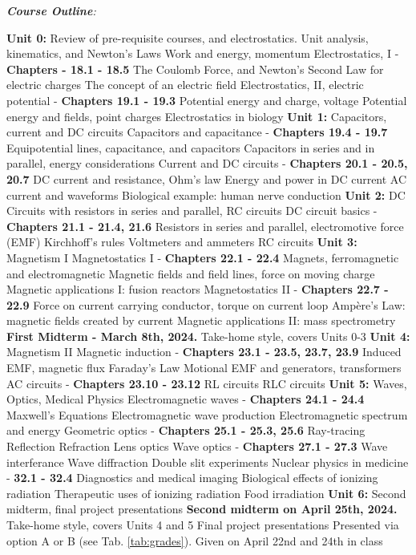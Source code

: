 \documentclass[10pt]{article}
\begin{document}
\clearpage
\twocolumn
\textit{\textbf{Course Outline}:}
\begin{outline}[enumerate]
\1 \textbf{Unit 0:} Review of pre-requisite courses, and electrostatics.
\2 Unit analysis, kinematics, and Newton's Laws
\2 Work and energy, momentum
\2 Electrostatics, I - \textbf{Chapters - 18.1 - 18.5}
\3 The Coulomb Force, and Newton's Second Law for electric charges
\3 The concept of an electric field
\2 Electrostatics, II, electric potential - \textbf{Chapters 19.1 - 19.3}
\3 Potential energy and charge, voltage
\3 Potential energy and fields, point charges
\3 Electrostatics in biology
\1 \textbf{Unit 1:} Capacitors, current and DC circuits
\2 Capacitors and capacitance - \textbf{Chapters 19.4 - 19.7}
\3 Equipotential lines, capacitance, and capacitors
\3 Capacitors in series and in parallel, energy considerations
\2 Current and DC circuits - \textbf{Chapters 20.1 - 20.5, 20.7}
\3 DC current and resistance, Ohm's law
\3 Energy and power in DC current
\3 AC current and waveforms
\3 Biological example: human nerve conduction
\1 \textbf{Unit 2:} DC Circuits with resistors in series and parallel, RC circuits
\2 DC circuit basics - \textbf{Chapters 21.1 - 21.4, 21.6}
\3 Resistors in series and parallel, electromotive force (EMF)
\3 Kirchhoff's rules
\3 Voltmeters and ammeters
\3 RC circuits
\1 \textbf{Unit 3:} Magnetism I
\2 Magnetostatics I - \textbf{Chapters 22.1 - 22.4}
\3 Magnets, ferromagnetic and electromagnetic
\3 Magnetic fields and field lines, force on moving charge
\3 Magnetic applications I: fusion reactors
\2 Magnetostatics II - \textbf{Chapters 22.7 - 22.9}
\3 Force on current carrying conductor, torque on current loop
\3 Amp\`{e}re's Law: magnetic fields created by current
\3 Magnetic applications II: mass spectrometry
\1 \textbf{First Midterm - March 8th, 2024.}
\2 Take-home style, covers Units 0-3
\1 \textbf{Unit 4:} Magnetism II
\2 Magnetic induction - \textbf{Chapters 23.1 - 23.5, 23.7, 23.9}
\3 Induced EMF, magnetic flux
\3 Faraday's Law
\3 Motional EMF and generators, transformers
\2 AC circuits - \textbf{Chapters 23.10 - 23.12}
\3 RL circuits
\3 RLC circuits
\1 \textbf{Unit 5:} Waves, Optics, Medical Physics
\2 Electromagnetic waves - \textbf{Chapters 24.1 - 24.4}
\3 Maxwell's Equations
\3 Electromagnetic wave production
\3 Electromagnetic spectrum and energy
\2 Geometric optics - \textbf{Chapters 25.1 - 25.3, 25.6}
\3 Ray-tracing
\3 Reflection
\3 Refraction
\3 Lens optics
\2 Wave optics - \textbf{Chapters 27.1 - 27.3}
\3 Wave interferance
\3 Wave diffraction
\3 Double slit experiments
\2 Nuclear physics in medicine - \textbf{32.1 - 32.4}
\3 Diagnostics and medical imaging
\3 Biological effects of ionizing radiation
\3 Therapeutic uses of ionizing radiation
\3 Food irradiation
\1 \textbf{Unit 6:} Second midterm, final project presentations
\2 \textbf{Second midterm on April 25th, 2024.}
\3 Take-home style, covers Units 4 and 5
\2 Final project presentations
\3 Presented via option A or B (see Tab. \ref{tab:grades}).
\3 Given on April 22nd and 24th in class
\end{outline}
\end{document}
